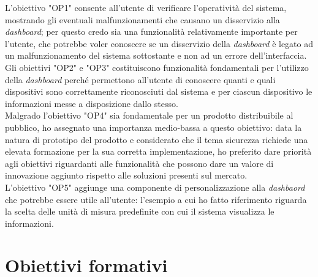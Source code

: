 L'obiettivo "OP1" consente all'utente di verificare l'operatività del sistema, mostrando gli eventuali malfunzionamenti che causano un disservizio alla \emph{dashboard}; per questo credo sia una funzionalità relativamente importante per l'utente, che potrebbe voler conoscere se un disservizio della \emph{dashboard} è legato ad un malfunzionamento del sistema sottostante e non ad un errore dell'interfaccia. \\

Gli obiettivi "OP2" e "OP3" costituiscono funzionalità fondamentali per l'utilizzo della \emph{dashboard} perché permettono all'utente di conoscere quanti e quali dispositivi sono correttamente riconosciuti dal sistema e per ciascun dispositivo le informazioni messe a disposizione dallo stesso. \\

Malgrado l'obiettivo "OP4" sia fondamentale per un prodotto distribuibile al pubblico, ho assegnato una importanza medio-bassa a questo obiettivo: data la natura di prototipo del prodotto e considerato che il tema sicurezza richiede una elevata formazione per la sua corretta implementazione, ho preferito dare priorità agli obiettivi riguardanti alle funzionalità che possono dare un valore di innovazione aggiunto rispetto alle soluzioni presenti sul mercato. \\

L'obiettivo "OP5" aggiunge una componente di personalizzazione alla \emph{dashbaord} che potrebbe essere utile all'utente: l'esempio a cui ho fatto riferimento riguarda la scelta delle unità di misura predefinite con cui il sistema visualizza le informazioni. \\

\section{Obiettivi formativi}

